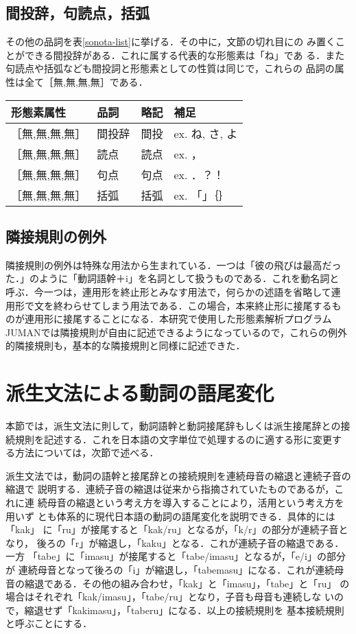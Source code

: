 \subsection{間投辞，句読点，括弧}
その他の品詞を表\ref{sonota-list}に挙げる．その中に，文節の切れ目にの
み置くことができる間投辞がある．これに属する代表的な形態素は「ね」であ
る．また句読点や括弧なども間投詞と形態素としての性質は同じで，これらの
品詞の属性は全て［無,無,無,無］である．
\begin{table*}
\begin{center}
\begin{tabular}{|l|l|l|l|}
\hline
形態素属性 & 品詞 & 略記 & 補足 \\
\hline
［無,無,無,無］ & 間投辞 & 間投 & ex. ね, さ, よ \\
［無,無,無,無］ & 読点 & 読点 & ex. ，  \\
［無,無,無,無］ & 句点 & 句点 & ex. ．？！ \\
［無,無,無,無］ & 括弧 & 括弧 & ex. 「」｛｝ \\
\hline
\end{tabular}
\end{center}
\caption{間投辞，句読点，括弧}
\label{sonota-list}
\end{table*}

\subsection{隣接規則の例外}
隣接規則の例外は特殊な用法から生まれている．一つは「彼の飛びは最高だっ
た．」のように「動詞語幹＋i」を名詞として扱うものである．これを動名詞と
呼ぶ．今一つは，連用形を終止形とみなす用法で，何らかの述語を省略して連
用形で文を終わらせてしまう用法である．この場合，本来終止形に接尾するも
のが連用形に接尾することになる．本研究で使用した形態素解析プログラム
JUMANでは隣接規則が自由に記述できるようになっているので，これらの例外
的隣接規則も，基本的な隣接規則と同様に記述できた．



\section{派生文法による動詞の語尾変化} \label{verb}
本節では，派生文法に則して，動詞語幹と動詞接尾辞もしくは派生接尾辞との接
続規則を記述する．これを日本語の文字単位で処理するのに適する形に変更す
る方法については，次節で述べる．

派生文法では，動詞の語幹と接尾辞との接続規則を連続母音の縮退と連続子音の縮退で
説明する．連続子音の縮退は従来から指摘されていたものであるが，これに連
続母音の縮退という考え方を導入することにより，活用という考え方を用いず
とも体系的に現代日本語の動詞の語尾変化を説明できる．具体的には「kak」
に「ru」が接尾すると「kak/ru」となるが，「k/r」の部分が連続子音となり，
後ろの「r」が縮退し，「kaku」となる．これが連続子音の縮退である．一方
「tabe」に「imasu」が接尾すると「tabe/imasu」となるが，「e/i」の部分が
連続母音となって後ろの「i」が縮退し，「tabemasu」になる．これが連続母
音の縮退である．その他の組み合わせ，「kak」と「imasu」，「tabe」と「ru」
の場合はそれぞれ「kak/imasu」，「tabe/ru」となり，子音も母音も連続しな
いので，縮退せず「kakimasu」，「taberu」になる．以上の接続規則を
基本接続規則と呼ぶことにする．

